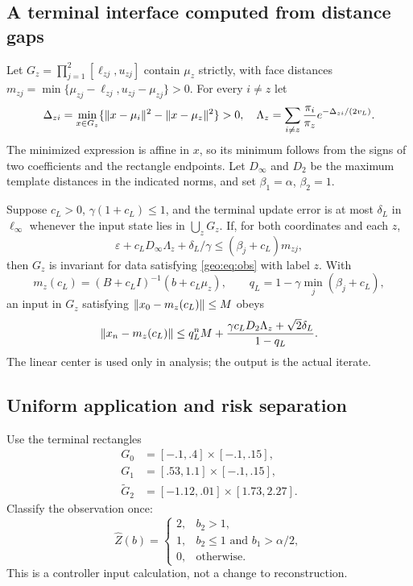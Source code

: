 \subsection{A terminal interface computed from distance gaps}
Let $G_z=\prod_{j=1}^2[\ell_{zj},u_{zj}]$ contain $\mu_z$ strictly, with
face distances
$m_{zj}=\min\{\mu_{zj}-\ell_{zj},u_{zj}-\mu_{zj}\}>0$.
For every $i\ne z$ let
\begin{equation}\label{geo:eq:gaps}
 \Delta_{zi}=\min_{x\in G_z}
 \{\lVert x-\mu_i\rVert^2-\lVert x-\mu_z\rVert^2\}>0,
 \quad
 \Lambda_z=\sum_{i\ne z}\frac{\pi_i}{\pi_z}
 e^{-\Delta_{zi}/(2v_L)}.
\end{equation}
The minimized expression is affine in $x$, so its minimum follows from the
signs of two coefficients and the rectangle endpoints. Let $D_\infty$ and
$D_2$ be the maximum template distances in the indicated norms, and set
$\beta_1=\alpha$, $\beta_2=1$.

\begin{proposition}\label{geo:prop:terminal}
Suppose $c_L>0$, $\gamma(1+c_L)\le1$, and the terminal update error is at most
$\delta_L$ in $\ell_\infty$ whenever the input state lies in $\bigcup_zG_z$.
If, for both coordinates and each $z$,
\begin{equation}\label{geo:eq:terminaltest}
 \varepsilon+c_LD_\infty\Lambda_z+\delta_L/\gamma
 \le (\beta_j+c_L)m_{zj},
\end{equation}
then $G_z$ is invariant for data satisfying \eqref{geo:eq:obs} with label $z$.
With
\[
 m_z(c_L)=(B+c_LI)^{-1}(b+c_L\mu_z),\qquad
 q_L=1-\gamma\min_j(\beta_j+c_L),
\]
an input in $G_z$ satisfying $\lVert x_0-m_z(c_L)\rVert\le M$ obeys
\begin{equation}\label{geo:eq:terminalres}
 \lVert x_n-m_z(c_L)\rVert
 \le q_L^nM+\frac{\gamma c_LD_2\Lambda_z+\sqrt2\delta_L}{1-q_L}.
\end{equation}
The linear center is used only in analysis; the output is the actual iterate.
\end{proposition}

\subsection{Uniform application and risk separation}
Use the terminal rectangles
\begin{equation}\label{geo:eq:rectangles}
\begin{aligned}
 G_0&=[-.1,.4]\times[-.1,.15],\\
 G_1&=[.53,1.1]\times[-.1,.15],\\
 \widetilde G_2&=[-1.12,.01]\times[1.73,2.27].
\end{aligned}
\end{equation}
Classify the observation once:
\begin{equation}\label{geo:eq:classifier}
 \widehat Z(b)=
 \begin{cases}
 2,&b_2>1,\\
 1,&b_2\le1\text{ and }b_1>\alpha/2,\\
 0,&\text{otherwise}.
 \end{cases}
\end{equation}
This is a controller input calculation, not a change to reconstruction.

